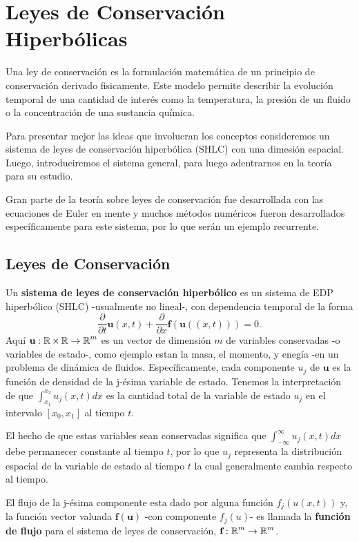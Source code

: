 \chapter{Leyes de Conservación Hiperbólicas}\label{cap:Leyes}

Una ley de conservación es la formulación matemática de un principio de conservación derivado fisicamente. Este modelo permite describir la evolución temporal de una cantidad de interés como la temperatura, la presión de un fluido o la concentración de una sustancia química. 

Para presentar mejor las ideas que involucran los conceptos consideremos un sistema de leyes de conservación hiperbólica (SHLC) con una dimesión espacial. Luego, introduciremos el sistema general, para luego adentrarnos en la teoría para su estudio.

Gran parte de la teoría sobre leyes de conservación fue desarrollada con las ecuaciones de Euler en mente y muchos métodos numéricos fueron desarrollados específicamente para este sistema, por lo que serán un ejemplo recurrente.


\section{Leyes de Conservación}
Un \textbf{sistema de leyes de conservación  hiperbólico} es un sistema de EDP hiperbólico (SHLC) -usualmente no lineal-, con dependencia temporal de la forma
\[
\frac{\partial}{\partial t} \textbf{u}(x,t) + \frac{\partial}{\partial x} \textbf{f}(\textbf{u}((x,t))) = 0.
\]
Aquí $\textbf{u}:\operatorname{\mathbb R} \times \operatorname{\mathbb R} \rightarrow \operatorname{\mathbb R}^m$ es un vector de dimensión $m$ de variables conservadas -o variables de estado-, como ejemplo estan la masa, el momento, y enegía -en un problema de dinámica de fluidos. Específicamente, cada componente $u_j$ de $\textbf{u}$ es la función de densidad de la j-ésima variable de estado.
Tenemos la interpretación de que $\int_{x_1}^{x_2} u_j(x,t)dx$ es la cantidad total de la variable de estado $u_j$ en el intervalo $[x_0, x_1]$ al tiempo $t$.

El hecho de que estas variables sean conservadas significa que $\int_{-\infty}^{\infty} u_j(x,t) dx$ debe permanecer constante al tiempo $t$, por lo que $u_j$ representa la distribución espacial de la variable de estado al tiempo $t$ la cual generalmente cambia respecto al tiempo.

El flujo de la j-ésima componente esta dado por alguna función $f_j(u(x,t))$ y, la función vector valuada $\textbf{f}(\textbf{u})$ -con componente $f_j(u)$- es llamada la \textbf{función de flujo} para el sistema de leyes de conservación, $\textbf{f}:\operatorname{\mathbb R}^m \rightarrow \operatorname{\mathbb R}^m$.

